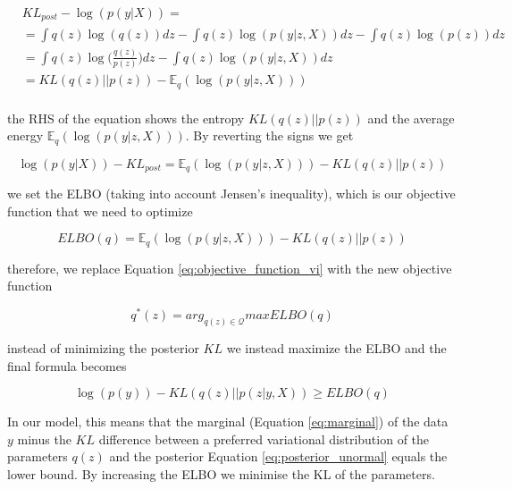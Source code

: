 \documentclass[12pt]{article}
\begin{document}
\begin{align}
& KL_{post} - \log(p(y|X)) = \\ \nonumber
& = \int q(z) \log(q(z)) dz - \int q(z) \log(p(y|z, X))dz - \int q(z) \log(p(z))dz \\ \nonumber
&= \int q(z) \log\bigg(\frac{q(z)}{p(z)}\bigg)dz - \int q(z) \log(p(y|z, X))dz \\ \nonumber
&= KL(q(z)||p(z)) - \mathbb{E}_{q}(\log(p(y|z, X))) \\ \nonumber
\end{align}


the RHS of the equation shows the entropy $KL(q(z)||p(z))$ and the average energy $\mathbb{E}_{q}(\log(p(y|z, X)))$.
By reverting the signs we get

\begin{equation}
\log(p(y|X)) - KL_{post} = \mathbb{E}_{q}(\log(p(y|z, X))) - KL(q(z)||p(z)) 
\end{equation}

we set the ELBO  (taking into account Jensen's inequality), which is our objective function that we need to optimize

\begin{equation}
ELBO(q) = \mathbb{E}_{q}(\log(p(y|z, X))) - KL(q(z)||p(z)) 
\end{equation}

therefore, we replace Equation \ref{eq:objective_function_vi} with the new objective function 

\begin{equation}
q^{*}(z) = arg_{q(z) \in \mathcal{Q}}maxELBO(q) 
\end{equation}

instead of minimizing the posterior $KL$ we instead maximize the ELBO and the final formula becomes

\begin{equation}
\log(p(y)) - KL(q(z)||p(z|y, X)) \geq ELBO(q)
\end{equation}

In our model, this means that the marginal (Equation \ref{eq:marginal}) of the data $y$ minus the $KL$ difference between a preferred variational distribution of the parameters $q(z)$ and the posterior Equation \ref{eq:posterior_unormal} equals the lower bound. By increasing the ELBO we minimise the KL of the parameters. 



%
%
\end{document}
